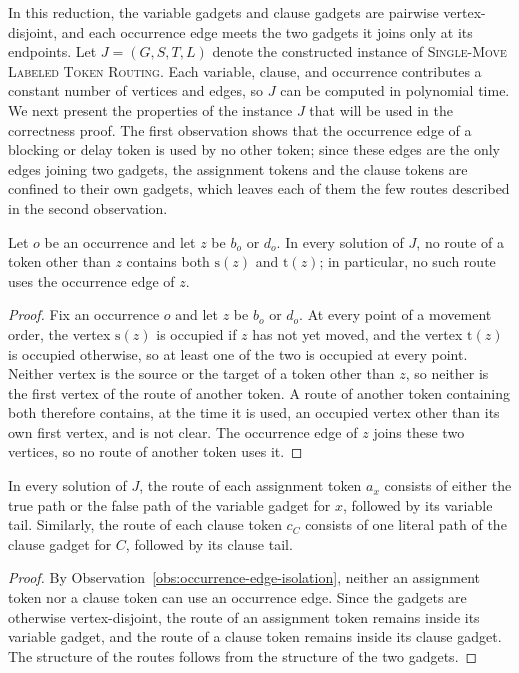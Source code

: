 \documentclass[a4paper,USenglish,thm-restate]{lipics-v2021}
\newcommand{\src}{\mathrm{s}}
\newcommand{\tgt}{\mathrm{t}}
\theoremstyle{problemstyle}
\begin{document}
\smallskip
In this reduction, the variable gadgets and clause gadgets are pairwise vertex-disjoint, and each occurrence edge meets the two gadgets it joins only at its endpoints. Let $J=(G,S,T,L)$ denote the constructed instance of \textsc{Single-Move Labeled Token Routing}. Each variable, clause, and occurrence contributes a constant number of vertices and edges, so $J$ can be computed in polynomial time.
%
We next present the properties of the instance $J$ that will be used in
the correctness proof. The first observation shows that the occurrence edge of a blocking or
delay token is used by no other token; since these edges are
the only edges joining two gadgets, the assignment tokens and the clause
tokens are confined to their own gadgets, which leaves each of them the
few routes described in the second observation.

\begin{observation}\label{obs:occurrence-edge-isolation}
Let $o$ be an occurrence and let $z$ be $b_o$ or $d_o$. In every solution
of $J$, no route of a token other than $z$ contains both $\src(z)$ and
$\tgt(z)$; in particular, no such route uses the occurrence edge of $z$.
\end{observation}

\begin{proof}
Fix an occurrence $o$ and let $z$ be $b_o$ or $d_o$. At every point of a
movement order, the vertex $\src(z)$ is occupied if $z$ has not yet moved,
and the vertex $\tgt(z)$ is occupied otherwise, so at least one of the two
is occupied at every point. Neither vertex is the source or the target of
a token other than $z$, so neither is the first vertex of the route of
another token. A route of another token containing both therefore
contains, at the time it is used, an occupied vertex other than its own
first vertex, and is not clear. The occurrence edge of $z$ joins these
two vertices, so no route of another token uses it.
\end{proof}

\begin{observation}\label{obs:variable-clause-route-forms}
In every solution of $J$, the route of each assignment token $a_x$ consists of either the true path or the false path of the variable gadget for $x$, followed by its variable tail. Similarly, the route of each clause token $c_C$ consists of one literal path of the clause gadget for $C$, followed by its clause tail.
\end{observation}

\begin{proof}
By Observation~\ref{obs:occurrence-edge-isolation}, neither an assignment token nor a clause token can use an occurrence edge. Since the gadgets are otherwise vertex-disjoint, the route of an assignment token remains inside its variable gadget, and the route of a clause token remains inside its clause gadget. The structure of the routes follows from the structure of the two gadgets.
\end{proof}
\end{document}
